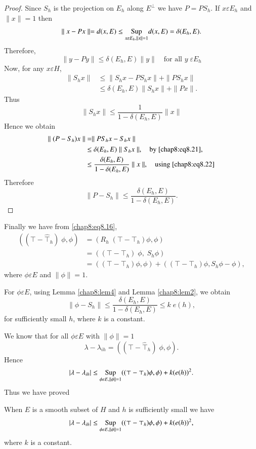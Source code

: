 \begin{proof}
Since $S_h$ is the projection on $E_h$ along $E^\bot$ we have
$P=PS_h$. If $x\varepsilon E_h$ and $\parallel x\parallel =1$ then 
$$
\parallel x-Px\parallel=d(x,E)\leq \underset{x\varepsilon E_h,
\parallel x\parallel=1}{\operatorname{Sup}}d(x,E)=\delta(E_h,E).
$$
Therefore,
\begin{equation}\label{chap8:eq8.21}
\parallel y-Py\parallel\leq\delta(E_h,E)\parallel y\parallel\quad
\text{for all } y\;\varepsilon E_h
\end{equation}
Now, for any $x\varepsilon H$,
\begin{align*}
\parallel S_hx\parallel &\leq \parallel S_hx-PS_hx\parallel +\parallel
PS_hx\parallel\\
&\leq \delta(E_h,E)\parallel S_hx\parallel + \parallel Px\parallel.
\end{align*}
Thus
\begin{equation}\label{chap8:eq8.22}
\parallel S_hx\parallel \leq \frac{1}{1-\delta(E_h,E)}\parallel
x\parallel 
\end{equation}
Hence we obtain
\begin{align*}
\parallel(P-S_h)x\parallel &= \parallel PS_hx-S_hx\parallel\\
&\leq\delta(E_h,E)\parallel S_hx\parallel,\quad\text{by
\eqref{chap8:eq8.21}},\\
&\leq\frac{\delta(E_h,E)}{1-\delta(E_h,E)}\parallel x\parallel,
\quad\text{using \eqref{chap8:eq8.22}}
\end{align*}
Therefore 
$$
\parallel P-S_h\parallel \leq \frac{\delta(E_h,E)}{1-\delta(E_h, E)}. 
$$
\end{proof}

Finally we have from \eqref{chap8:eq8.16}, 
\begin{align*}
((\top-\hat{\top}_h)\;\phi,\phi) &= (R_h\;(\top-\top_h)\phi,\phi)\\
&= ((\top-\top_h)\;\phi,\;S_h\phi)\\
&= ((\top-\top_h)\phi,\phi)+((\top-\top_h)\phi,S_h\phi-\phi),
\end{align*}\pageoriginale
where $\phi\varepsilon E$ and $\parallel\phi\parallel=1$.

\noindent For $\phi\varepsilon E$, using Lemma \ref{chap8:lem4} and
Lemma \ref{chap8:lem2}, we obtain
$$
\parallel\phi-S_h\parallel \leq \frac{\delta(E_h,E)}{1-\delta(E_h, E)}
\leq k\;e(h),
$$
for sufficiently small $h$, where $k$ is a constant.

We know that for all $\phi\varepsilon E$ with $\parallel\phi\parallel
=1$
$$
\lambda-\lambda_{ih}=((\top-\hat{\top}_h)\;\phi,\phi).
$$
Hence 
$$
|\lambda-\lambda_{ih}|\leq\underset{\phi\varepsilon E,\parallel\phi
\parallel =1}{\operatorname{Sup}}((\top-\top_h)\phi,\phi)+k(e(h))^2.
$$
Thus we have proved 
\setcounter{THM}{4}
\begin{THM}\label{chap8:THM5}
When $E$ is a smooth subset of $H$ and $h$ is sufficiently small we
have 
\begin{equation}\label{chap8:eq8.23}
|\lambda-\lambda_{ih}|\leq\underset{\phi\varepsilon E,\parallel\phi
\parallel=1}{\operatorname{Sup}}((\top-\top_h)\phi,\phi)+k(e(h))^2,
\end{equation}
where $k$ is a constant.
\end{THM}


